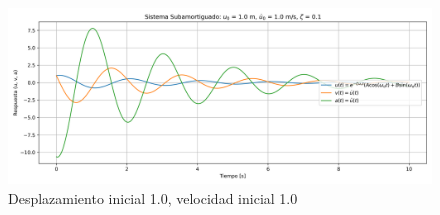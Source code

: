 \documentclass{article}  %
\begin{document}
\begin{figure}[H]
    \centering
    \includegraphics[width=1\textwidth]{GRAFICOS/sis_subamortiguado_u0_1.0_v0_1.0_zeta_0.1.png}
    \caption{Desplazamiento inicial 1.0, velocidad inicial 1.0}
    \label{fig:ejemplo1}
\end{figure}
\end{document}
